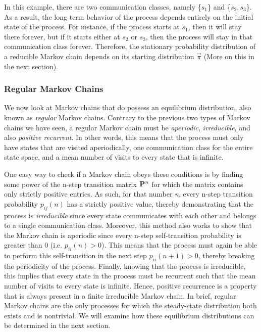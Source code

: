 \documentclass[a4paper,12pt]{article}
\theoremstyle{definition}
\let\oldtextbf\mathbf
\renewcommand{\mathbf}[1]{\oldtextbf{\boldmath #1}}
\begin{document}
	In this example, there are two communication classes, namely \{$s_1$\} and \{$s_2,s_3$\}. As a result, the long term behavior of 
	the process depends entirely on the initial state of the process. For instance, if the process starts at $s_1$, then it will stay 
	there forever, but if it starts either at $s_2$ or $s_3$, then the process will stay in that communication class forever. Therefore, 
	the stationary probability distribution of a reducible Markov chain depends on its starting distribution $\vec{\pi}$ (More on this in 
	the next section). 

	\subsubsection*{Regular Markov Chains}

	We now look at Markov chains that do possess an equilibrium distribution, also known as \emph{regular} Markov chains. Contrary to the previous two types of Markov chains we have seen, a regular Markov chain must be \emph{aperiodic}, \emph{irreducible}, and also \emph{positive recurrent}. In other words, this means that the process must only have states that are visited aperiodically, one communication class for the entire state space, and a mean number of visits to every state that is infinite.
	
	 One easy way to check if a Markov chain obeys these conditions is by finding some power of the n-step transition matrix $\mathbf{P}^n$ for which the matrix contains only strictly positive entries. As such, for that number \emph{n}, every n-step transition probability $p_{ij}(n)$ has a strictly positive value, thereby demonstrating that the process is \emph{irreducible} since every state communicates with each other and belongs to a single communication class.  Moreover, this method also works to show that the Markov chain is aperiodic since every n-step self-transition probability is greater than 0 (i.e. $p_{ii}(n) > 0$).  This means that the process must again be able to perform this self-transition in the next step $p_{ii}(n+1) > 0$, thereby breaking the periodicity of the process. Finally, knowing that the process is irreducible, this implies that every state in the process must be recurrent such that the mean number of visits to every state is infinite. Hence, positive recurrence is a property that is always present in a finite irreducible Markov chain. 
	 In brief, regular Markov chains are the only processes for which the steady-state distribution both exists and is nontrivial. We will examine how these equilibrium distributions can be determined in the next section.
	
\end{document}
